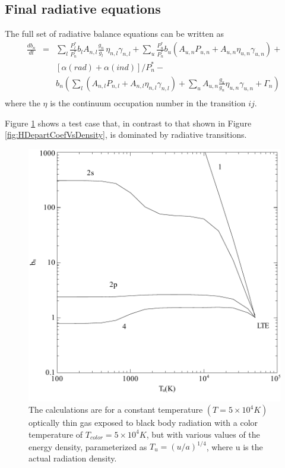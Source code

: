 \subsection{Final radiative equations}

The full set of radiative balance equations can be written as
\begin{equation}
\begin{array}{ccc}
 \frac{{d{b_n}}}{{dt}}& = & \sum\limits_l
{\frac{{P_l^*}}{{P_n^*}}{b_l}{A_{n,l}}\frac{{{g_n}}}{{{g_l}}}\,{\eta
_{n,l}}{\gamma _{n,l}} + \sum\limits_u {\frac{{P_u^*}}{{P_n^*}}{b_u}\left(
{{A_{u,n}}{P_{u,n}} + {A_{u,n}}{\eta _{u,n}}{\gamma _{u,n}}} \right)} }
+  \\
&&
 \left[ {\alpha \left( {rad} \right) + \alpha \left( {ind} \right)}
\right]/P_n^* -  \\
&&
 {b_n}\left( {\sum\limits_l {\left( {{A_{n,l}}{P_{n,l}} + {A_{n,l}}{\eta
_{n,l}}{\gamma _{n,l}}} \right) + \sum\limits_u
{{A_{u,n}}\frac{{{g_u}}}{{{g_n}}}{\eta _{u,n}}{\gamma _{u,n}} + {\Gamma
_n}} } } \right) \\
 \end{array}
\end{equation}
where the $\eta$ is the continuum occupation number in the transition $ij$.

Figure \ref{fig:HDepartCoefVsRadiationField} shows a test case that,
in contrast to that shown in Figure
\ref{fig:HDepartCoefVsDensity},
is dominated by radiative transitions.

\begin{figure}
\label{fig:HDepartCoefVsRadiationField}
\centering
\includegraphics[scale=0.8]{HDepartCoefVsRadiationField}
\caption[H populations vs radiation field]{The calculations are for a constant temperature $(T = 5 \times
10^4 K)$
optically thin gas exposed to black body radiation with a color temperature
of $T_{color} = 5 \times 10^4 K$, but with various values of the energy density,
parameterized as $T_u = (u/a)^{1/4}$, where u is the actual radiation
density.}
\end{figure}


